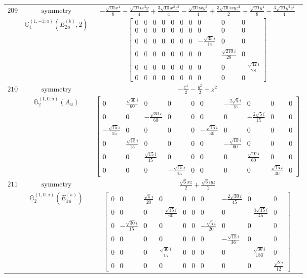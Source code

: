 \documentclass[fleqn,8pt,landscape]{jsarticle}
\begin{document}
\begin{longtable}{ccc}
$ 209 $ & $ \text{symmetry} $ & $ - \frac{\sqrt{10} x^{4}}{8} - \frac{\sqrt{10} i x^{3} y}{4} + \frac{3 \sqrt{10} x^{2} z^{2}}{4} - \frac{\sqrt{10} i x y^{3}}{4} + \frac{3 \sqrt{10} i x y z^{2}}{2} + \frac{\sqrt{10} y^{4}}{8} - \frac{3 \sqrt{10} y^{2} z^{2}}{4} $ \\
$  $ & $ \mathbb{G}_{4}^{(1,-1;a)}(E_{2u}^{(b)},2) $ & $ \begin{bmatrix} 0 & 0 & 0 & 0 & 0 & 0 & 0 & 0 & 0 & 0 \\ 0 & 0 & 0 & 0 & 0 & 0 & 0 & 0 & 0 & 0 \\ 0 & 0 & 0 & 0 & 0 & 0 & 0 & - \frac{\sqrt{35} i}{14} & 0 & 0 \\ 0 & 0 & 0 & 0 & 0 & 0 & 0 & 0 & \frac{\sqrt{210} i}{28} & 0 \\ 0 & 0 & 0 & 0 & 0 & 0 & 0 & 0 & 0 & - \frac{\sqrt{42} i}{28} \\ 0 & 0 & 0 & 0 & 0 & 0 & 0 & 0 & 0 & 0 \end{bmatrix} $ \\ \hline
$ 210 $ & $ \text{symmetry} $ & $ - \frac{x^{2}}{2} - \frac{y^{2}}{2} + z^{2} $ \\
$  $ & $ \mathbb{G}_{2}^{(1,0;a)}(A_{u}) $ & $ \begin{bmatrix} 0 & \frac{\sqrt{30} i}{60} & 0 & 0 & 0 & 0 & - \frac{2 \sqrt{5} i}{15} & 0 & 0 & 0 \\ 0 & 0 & - \frac{\sqrt{30} i}{60} & 0 & 0 & 0 & 0 & - \frac{2 \sqrt{5} i}{15} & 0 & 0 \\ - \frac{\sqrt{15} i}{15} & 0 & 0 & 0 & 0 & - \frac{\sqrt{15} i}{30} & 0 & 0 & 0 & 0 \\ 0 & \frac{\sqrt{15} i}{15} & 0 & 0 & 0 & 0 & - \frac{\sqrt{10} i}{60} & 0 & 0 & 0 \\ 0 & 0 & \frac{\sqrt{15} i}{15} & 0 & 0 & 0 & 0 & \frac{\sqrt{10} i}{60} & 0 & 0 \\ 0 & 0 & 0 & - \frac{\sqrt{15} i}{15} & 0 & 0 & 0 & 0 & \frac{\sqrt{15} i}{30} & 0 \end{bmatrix} $ \\ \hline
$ 211 $ & $ \text{symmetry} $ & $ \frac{\sqrt{6} x z}{2} + \frac{\sqrt{6} i y z}{2} $ \\
$  $ & $ \mathbb{G}_{2}^{(1,0;a)}(E_{1u}^{(a)}) $ & $ \begin{bmatrix} 0 & 0 & \frac{\sqrt{5} i}{20} & 0 & 0 & 0 & 0 & - \frac{2 \sqrt{30} i}{45} & 0 & 0 \\ 0 & 0 & 0 & - \frac{\sqrt{15} i}{60} & 0 & 0 & 0 & 0 & - \frac{4 \sqrt{15} i}{45} & 0 \\ 0 & - \frac{\sqrt{30} i}{15} & 0 & 0 & 0 & 0 & - \frac{\sqrt{5} i}{20} & 0 & 0 & 0 \\ 0 & 0 & 0 & 0 & 0 & 0 & 0 & - \frac{\sqrt{15} i}{36} & 0 & 0 \\ 0 & 0 & 0 & \frac{\sqrt{30} i}{15} & 0 & 0 & 0 & 0 & - \frac{\sqrt{30} i}{180} & 0 \\ 0 & 0 & 0 & 0 & 0 & 0 & 0 & 0 & 0 & \frac{\sqrt{2} i}{12} \end{bmatrix} $ \\ \hline

\end{longtable}
\end{document}
